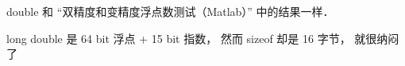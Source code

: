 

double 和 “双精度和变精度浮点数测试（Matlab）” 中的结果一样．

long double 是 64 bit 浮点 + 15 bit 指数， 然而 sizeof 却是 16 字节， 就很纳闷了


